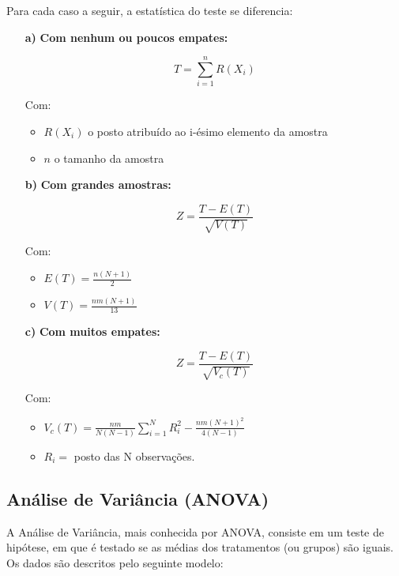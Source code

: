 \documentclass[
  portuguese,
]{estat/estat}
\begin{document}

Para cada caso a seguir, a estatística do teste se diferencia:
\begin{itemize}
\item [\bf a)] \textbf{Com nenhum ou poucos empates:}

$$T = \sum_{i=1}^{n}R(X_{i})$$

Com:
\begin{itemize}
\item $R(X_{i})$ o posto atribuído ao i-ésimo elemento da amostra

\item $n$ o tamanho da amostra

\end{itemize}

\item [\bf b)] \textbf{Com grandes amostras:}

$$Z = \frac{T - E(T)}{\sqrt{V(T)}}$$

Com:
\begin{itemize}
\item $E(T) = \displaystyle\frac{n(N+1)}{2}$ 

\item $V(T) = \displaystyle\frac{nm(N+1)}{13}$

\end{itemize}

\item [\bf c)] \textbf{Com muitos empates:}

$$Z = \frac{T - E(T)}{\sqrt{V_{c}(T)}}$$

Com:
\begin{itemize}
\item $V_{c}(T) = \displaystyle \frac{nm}{N(N-1)}\sum_{i=1}^{N}R^{2}_{i}-\frac{nm(N+1)^{2}}{4(N-1)}$ 

\item $R_{i} = $ posto das N observações.

\end{itemize}

\end{itemize}

\subsection{Análise de Variância
(ANOVA)}\label{anuxe1lise-de-variuxe2ncia-anova}

A Análise de Variância, mais conhecida por ANOVA, consiste em um teste
de hipótese, em que é testado se as médias dos tratamentos (ou grupos)
são iguais. Os dados são descritos pelo seguinte modelo:
\end{document}
